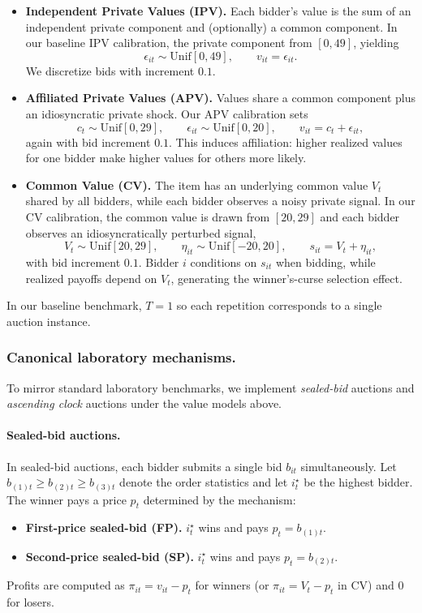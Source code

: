 \begin{itemize}
    \item \textbf{Independent Private Values (IPV).} Each bidder's value is the sum of an independent private component and (optionally) a common component. In our baseline IPV calibration, the private component from $[0,49]$, yielding
    \[
          \epsilon_{it} \sim \mathrm{Unif}[0,49], \qquad v_{it}=\epsilon_{it}.
    \]
    We discretize bids with increment $0.1$.

    \item \textbf{Affiliated Private Values (APV).} Values share a common component plus an idiosyncratic private shock. Our APV calibration sets
    \[
        c_t \sim \mathrm{Unif}[0,29], \qquad \epsilon_{it} \sim \mathrm{Unif}[0,20], \qquad v_{it}=c_t+\epsilon_{it},
    \]
    again with bid increment $0.1$. This induces affiliation: higher realized values for one bidder make higher values for others more likely.

    \item \textbf{Common Value (CV).} The item has an underlying common value $V_t$ shared by all bidders, while each bidder observes a noisy private signal. In our CV calibration, the common value is drawn from $[20,29]$ and each bidder observes an idiosyncratically perturbed signal,
    \[
        V_t \sim \mathrm{Unif}[20,29], \qquad \eta_{it} \sim \mathrm{Unif}[-20,20], \qquad s_{it}=V_t+\eta_{it},
    \]
    with bid increment $0.1$. Bidder $i$ conditions on $s_{it}$ when bidding, while realized payoffs depend on $V_t$, generating the winner's-curse selection effect.
\end{itemize}
In our baseline benchmark, $T=1$ so each repetition corresponds to a single auction instance.

\subsubsection{Canonical laboratory mechanisms.}
To mirror standard laboratory benchmarks, we implement \textit{sealed-bid} auctions and \textit{ascending clock} auctions under the value models above.

\paragraph{Sealed-bid auctions.}
In sealed-bid auctions, each bidder submits a single bid $b_{it}$ simultaneously. Let $b_{(1)t}\ge b_{(2)t}\ge b_{(3)t}$ denote the order statistics and let $i^\star_t$ be the highest bidder. The winner pays a price $p_t$ determined by the mechanism:
\begin{itemize}
    \item \textbf{First-price sealed-bid (FP).} $i^\star_t$ wins and pays $p_t=b_{(1)t}$.
    \item \textbf{Second-price sealed-bid (SP).} $i^\star_t$ wins and pays $p_t=b_{(2)t}$.
\end{itemize}
Profits are computed as $\pi_{it}=v_{it}-p_t$ for winners (or $\pi_{it}=V_t-p_t$ in CV) and $0$ for losers.

